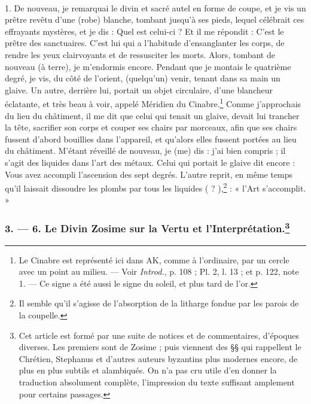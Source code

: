 \documentclass[a4paper, 11pt, oneside, polutonikogreek, french]{article}
\begin{document}
\paragraph{}
1. De nouveau, je remarquai le divin et sacré autel en forme de coupe, et je vis un prêtre revêtu d'une (robe) blanche, tombant jusqu'à ses pieds, lequel célébrait ces effrayants mystères, et je dis : Quel est celui-ci ? Et il me répondit : C'est le prêtre des sanctuaires. C'est lui qui a l'habitude d'ensanglanter les corps, de rendre les yeux clairvoyants et de ressusciter les morts. Alors, tombant de nouveau (à terre), je m'endormis encore. Pendant que je montais le quatrième degré, je vis, du côté de l'orient, (quelqu'un) venir, tenant dans sa main un glaive. Un autre, derrière lui, portait un objet circulaire, d'une blancheur éclatante, et très beau à voir, appelé Méridien du Cinabre.\footnote{Le Cinabre est représenté ici dans AK, comme à l'ordinaire, par un cercle avec un point au milieu. --- Voir \emph{Introd.}, p. 108 ; Pl. 2, l. 13 ; et p. 122, note 1. --- Ce signe a été aussi le signe du soleil, et plus tard de l'or.} Comme j'approchais du lieu du châtiment, il me dit que celui qui tenait un glaive, devait lui trancher la tête, sacrifier son corps et couper ses chairs par morceaux, afin que ses chairs fussent d'abord bouillies dans l'appareil, et qu'alors elles fussent portées au lieu du châtiment. M'étant réveillé de nouveau, je (me) dis : j'ai bien compris ; il s'agit des liquides dans l'art des métaux. Celui qui portait le glaive dit encore : Vous avez accompli l'ascension des sept degrés. L'autre reprit, en même temps qu'il laissait dissoudre les plombs par tous les liquides ( ? ),\footnote{Il semble qu'il s'agisse de l'absorption de la litharge fondue par les parois de la coupelle.} : « l'Art s'accomplit. »

\bigskip
\centerline{\EightStarTaper}
\centerline{\EightStarTaper\EightStarTaper}
\bigskip

\subsubsection[3. --- 6. Le Divin Zosime sur la Vertu et l'Interprétation.]{3. --- 6. Le Divin Zosime sur la Vertu et l'Interprétation.\footnote{Cet article est formé par une suite de notices et de commentaires, d'époques diverses. Les premiers sont de Zosime ; puis viennent des §§ qui rappellent le Chrétien, Stephanus et d'autres auteurs byzantins plus modernes encore, de plus en plus subtils et alambiqués. On n'a pas cru utile d'en donner la traduction absolument complète, l'impression du texte suffisant amplement pour certains passages.}}
\end{document}

